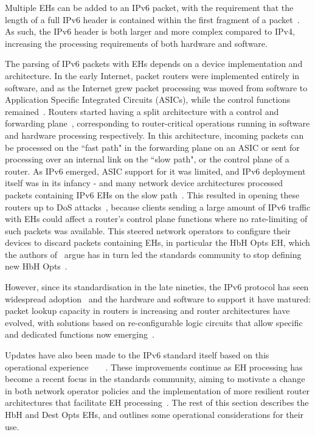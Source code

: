 \documentclass[conference]{IEEEtran}
\begin{document}
Multiple EHs can be added to an IPv6 packet, with the requirement that the length of a full IPv6 header is contained within the first fragment of a packet~\cite{RFC8200}. As such, the IPv6 header is both larger and more complex compared to IPv4, increasing the processing requirements of both hardware and software.

The parsing of IPv6 packets with EHs depends on a device implementation and architecture. In the early Internet, packet routers were implemented entirely in software, and as the Internet grew packet processing was moved from software to Application Specific Integrated Circuits (ASICs), while the control functions remained~\cite{router-architecture}. Routers started having a split architecture with a control and forwarding plane~\cite{RFC3654}, corresponding to router-critical operations running in software and hardware processing respectively. In this architecture, incoming packets can be processed on the ``fast path" in the forwarding plane on an ASIC or sent for processing over an internal link on the ``slow path", or the control plane of a router. As IPv6 emerged, ASIC support for it was limited, and IPv6 deployment itself was in its infancy - and many network device architectures processed packets containing IPv6 EHs on the slow path~\cite{ietf-v6ops-hbh-03}.
This resulted in opening these routers up to DoS attacks~\cite{naagas2021deh}, because clients sending a large amount of IPv6 traffic with EHs could affect a router's control plane functions where no rate-limiting of such packets was available. This steered network operators to configure their devices to discard packets containing EHs, in particular the HbH Opts EH, which the authors of~\cite{ietf-v6ops-hbh-03} argue has in turn led the standards community to stop defining new HbH Opts~\cite{ietf-v6ops-hbh-03}.

However, since its standardisation in the late nineties, the IPv6 protocol has seen widespread adoption~\cite{v6adoption_ton} and the hardware and software to support it have matured: packet lookup capacity in routers is increasing and router architectures have evolved, with solutions based on re-configurable logic circuits that allow specific and dedicated functions now emerging~\cite{cisco-silicon-one}.

Updates have also been made to the IPv6 standard itself based on this operational experience~\cite{RFC5722}~\cite{RFC6734}~\cite{RFC6564}~\cite{RFC8200}. These improvements continue as EH processing has become a recent focus in the standards community, aiming to motivate a change in both network operator policies and the implementation of more resilient router architectures that facilitate EH processing~\cite{ietf-6man-hbh-processing-06, ietf-v6ops-hbh-03, ietf-6man-eh-limits-02}.
The rest of this section describes the HbH and Dest Opts EHs, and outlines some operational considerations for their use.
\end{document}
